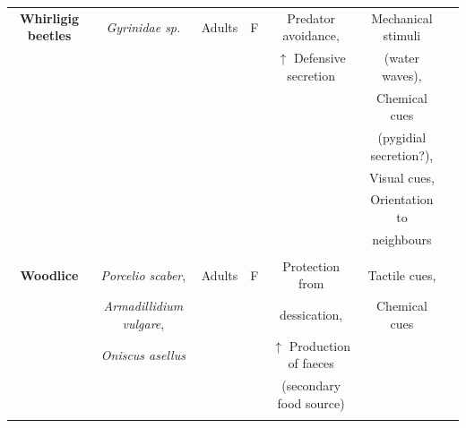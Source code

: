 \begin{landscape}
\begin{table}[t]
	
	\label{tab:mixedsp5}
	\centering
	\begin{tabular*}{\linewidth}{@{\extracolsep{\fill}}ccccccc}   
		\textbf{Whirligig beetles}	&\textit{Gyrinidae sp.}	&Adults	&F	&Predator avoidance,	&Mechanical stimuli	&\citep{heinrich_aggregation_1980,vulinec_aggregation_1989}\\
        &	&	&	&$\uparrow$ Defensive secretion	&(water waves),	&\\
        &	&	&	&	&Chemical cues	&\\
        &	&	&	&	&(pygidial secretion?),	&\\
        &	&	&	&	&Visual cues,	&\\
        &	&	&	&	&Orientation to	&\\
        &	&	&	&	&neighbours	&\\
        &	&	&	&	&	&\\
        
        \textbf{Woodlice}	&\textit{Porcelio scaber},	&Adults	&F	&Protection from	&Tactile cues,	&\cite{hassall_effects_2005}\\
        &\textit{Armadillidium vulgare},	&	&	&dessication,	&Chemical cues	&\\
        &\textit{Oniscus asellus}	&	&	&$\uparrow$ Production of faeces	&	&\\
        &	&	&	&(secondary food source)	&	&\\
        &	&	&	&	&	&\\
		\bottomrule
    \end{tabular*}
    \end{table}
		
\end{landscape}
 \clearpage

